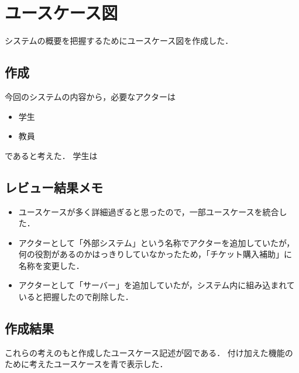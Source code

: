 \documentclass[documentclass]{jsarticle}
\begin{document}
\newpage

\section{ユースケース図}
システムの概要を把握するためにユースケース図を作成した．
\subsection*{作成}
今回のシステムの内容から，必要なアクターは
\begin{itemize}
  \item 学生
  \item 教員
\end{itemize}
であると考えた．
学生は

\subsection*{レビュー結果メモ}
\begin{itemize}
  \item ユースケースが多く詳細過ぎると思ったので，一部ユースケースを統合した．
  \item アクターとして「外部システム」という名称でアクターを追加していたが，
  何の役割があるのかはっきりしていなかったため，「チケット購入補助」に名称を変更した．
  \item アクターとして「サーバー」を追加していたが，システム内に組み込まれていると把握したので削除した．
\end{itemize}

\subsection*{作成結果}
これらの考えのもと作成したユースケース記述が図である．
付け加えた機能のために考えたユースケースを青で表示した．
\end{document}
